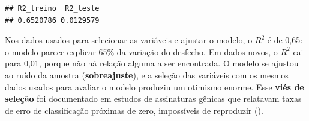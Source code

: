 \documentclass[
]{book}
\newenvironment{Shaded}{\begin{snugshade}}{\end{snugshade}}
\newcommand{\AttributeTok}[1]{\textcolor[rgb]{0.13,0.29,0.53}{#1}}
\newcommand{\ConstantTok}[1]{\textcolor[rgb]{0.56,0.35,0.01}{#1}}
\newcommand{\DecValTok}[1]{\textcolor[rgb]{0.00,0.00,0.81}{#1}}
\newcommand{\FunctionTok}[1]{\textcolor[rgb]{0.13,0.29,0.53}{\textbf{#1}}}
\newcommand{\NormalTok}[1]{#1}
\newcommand{\OtherTok}[1]{\textcolor[rgb]{0.56,0.35,0.01}{#1}}
\newcommand{\SpecialCharTok}[1]{\textcolor[rgb]{0.81,0.36,0.00}{\textbf{#1}}}
\begin{document}
\begin{Shaded}
\end{Shaded}

\begin{verbatim}
## R2_treino  R2_teste 
## 0.6520786 0.0129579
\end{verbatim}

Nos dados usados para selecionar as variáveis e ajustar o modelo, o \(R^2\) é de 0,65: o modelo parece explicar 65\% da variação do desfecho. Em dados novos, o \(R^2\) cai para 0,01, porque não há relação alguma a ser encontrada. O modelo se ajustou ao ruído da amostra (\textbf{sobreajuste}), e a seleção das variáveis com os mesmos dados usados para avaliar o modelo produziu um otimismo enorme. Esse \textbf{viés de seleção} foi documentado em estudos de assinaturas gênicas que relatavam taxas de erro de classificação próximas de zero, impossíveis de reproduzir ().
\end{document}
